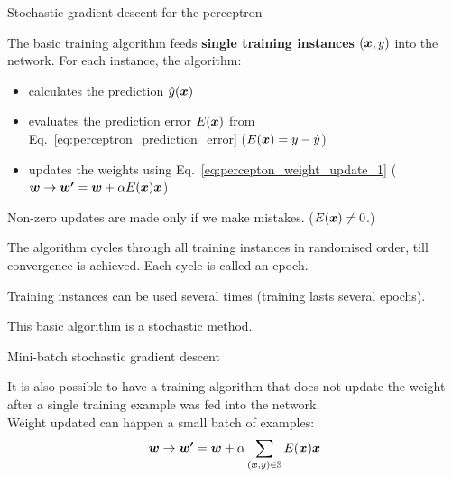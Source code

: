 
%
%
%

\begin{frame}[t]{Stochastic gradient descent for the perceptron}

    The basic training algorithm feeds 
    {\bf single training instances} $(\boldsymbol{x},y)$ into the network.
    For each instance, the algorithm:
    \begin{itemize}
        \item calculates the prediction $\hat{y}(\boldsymbol{x})$ 
        \item evaluates the prediction error $E(\boldsymbol{x})$ 
        from Eq.~\ref{eq:perceptron_prediction_error}
        ($E(\boldsymbol{x}) = y - \hat{y}$)
        \item updates the weights 
        using Eq.~\ref{eq:percepton_weight_update_1} 
        ($\boldsymbol{w} \rightarrow \boldsymbol{w^\prime} = \boldsymbol{w} + \alpha E(\boldsymbol{x}) \boldsymbol{x}$)
    \end{itemize}

    Non-zero updates are made only if we make mistakes. ($E(\boldsymbol{x}) \ne 0$.)\\
    \vspace{0.3cm}

    The algorithm cycles through all training instances in randomised order, 
    till convergence is achieved. 
    Each cycle is called an \gls{epoch}.\\
    \vspace{0.3cm}
    
    Training instances can be used several times (training lasts several epochs).\\ 
    \vspace{0.3cm}

    This basic algorithm is a 
    \gls{stochastic} 
     method.\\

\end{frame}


%
%
%

\begin{frame}[t]{Mini-batch stochastic gradient descent}

    It is also possible to have a training algorithm that does not 
    update the weight after a single training example was fed into the network.\\

    Weight updated can happen a small batch of examples:
    \begin{equation}
        \boldsymbol{w} \rightarrow \boldsymbol{w^\prime} = 
          \boldsymbol{w} + \alpha \sum_{(\boldsymbol{x},y) \in \mathbb{S}} E(\boldsymbol{x}) \boldsymbol{x}
        \label{eq:percepton_weight_update_minibatch_1}
      \end{equation}

\end{frame}

